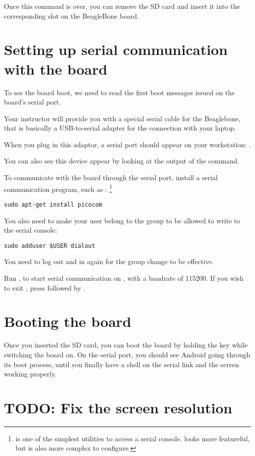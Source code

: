 Once this command is over, you can remove the SD card and insert it
into the corresponding slot on the BeagleBone board.

\section{Setting up serial communication with the board}

To see the board boot, we need to read the first boot messages issued
on the board's serial port.

Your instructor will provide you with a special serial cable for the
Beaglebone, that is basically a USB-to-serial adapter for the
connection with your laptop.

When you plug in this adaptor, a serial port should appear on your
workstation: .

You can also see this device appear by looking at the output of the
 command.

To communicate with the board through the serial port, install a
serial communication program, such as :
\footnote{ is one of the simplest utilities to access a
  serial console.  looks more featureful, but is also
  more complex to configure.}

\begin{verbatim}
sudo apt-get install picocom
\end{verbatim}

You also need to make your user belong to the  group to be
allowed to write to the serial console:

\begin{verbatim}
sudo adduser $USER dialout
\end{verbatim}

You need to log out and in again for the group change to be effective.

Run , to start serial
communication on , with a baudrate of 115200. If
you wish to exit , press \code{[Ctrl][a]} followed by
\code{[Ctrl][x]}.

\section{Booting the board}

Once you inserted the SD card, you can boot the board by holding the
 key while switching the board on. On the serial port, you
should see Android going through its boot process, until you finally
have a shell on the serial link and the screen working properly.

\section{TODO: Fix the screen resolution}
